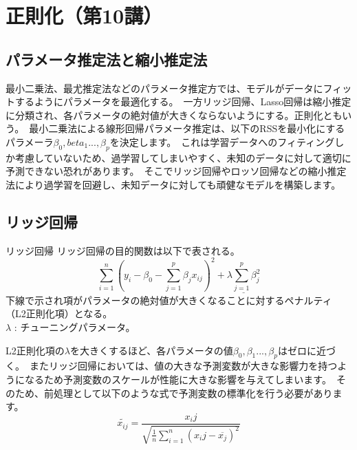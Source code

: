 \documentclass[uplatex]{jsarticle}
\begin{document}
\section{正則化（第10講）}
\subsection{パラメータ推定法と縮小推定法}
最小二乗法、最尤推定法などのパラメータ推定方では、モデルがデータにフィットするようにパラメータを最適化する。\
一方リッジ回帰、Lasso回帰は縮小推定に分類され、各パラメータの絶対値が大きくならないようにする。正則化ともいう。\
最小二乗法による線形回帰パラメータ推定は、以下の{\rm RSS}を最小化にするパラメーラ$\beta_0, beta_1..., \beta_p$を決定します。\
これは学習データへのフィティングしか考慮していないため、過学習してしまいやすく、未知のデータに対して適切に予測できない恐れがあります。\
そこでリッジ回帰やロッソ回帰などの縮小推定法により過学習を回避し、未知データに対しても頑健なモデルを構築します。

\subsection{リッジ回帰}
\begin{itembox}[l]{リッジ回帰}
  リッジ回帰の目的関数は以下で表される。
  $$\sum_{i=1}^n \left(y_i - \beta_0 - \sum_{j=1}^p \beta_jx_{ij}\right)^2 + \underline{\lambda \sum_{j=1}^p \beta_j^2}$$
下線で示され項がパラメータの絶対値が大きくなることに対するペナルティ（L2正則化項）となる。\\
$\lambda$ : チューニングパラメータ。
\end{itembox}
L2正則化項の$\lambda$を大きくするほど、各パラメータの値$\beta_0, \beta_1..., \beta_p$はゼロに近づく。\
またリッジ回帰においては、値の大きな予測変数が大きな影響力を持つようになるため予測変数のスケールが性能に大きな影響を与えてしまいます。\
そのため、前処理として以下のような式で予測変数の標準化を行う必要があります。
\begin{equation}
  \widetilde{x_{ij}} = \frac{x_ij}{\sqrt{\frac{1}{n} \sum_{i=1}^n (x_ij - \overline{x_j})^2}}
\end{equation}
\end{document}
